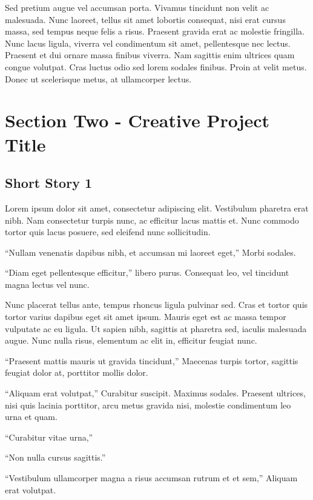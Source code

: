 \documentclass[a4paper]{memoir}
\begin{document}
Sed pretium augue vel accumsan porta. Vivamus tincidunt non velit ac malesuada. Nunc laoreet, tellus sit amet lobortis consequat, nisi erat cursus massa, sed tempus neque felis a risus. Praesent gravida erat ac molestie fringilla. Nunc lacus ligula, viverra vel condimentum sit amet, pellentesque nec lectus. Praesent et dui ornare massa finibus viverra. Nam sagittis enim ultrices quam congue volutpat. Cras luctus odio sed lorem sodales finibus. Proin at velit metus. Donec ut scelerisque metus, at ullamcorper lectus. 

\part{Section Two - Creative Project Title}
\label{sectiontwo-creativeprojecttitle}

\chapter{Short Story 1}
\label{shortstory1}

Lorem ipsum dolor sit amet, consectetur adipiscing elit. Vestibulum pharetra erat nibh. Nam consectetur turpis nunc, ac efficitur lacus mattis et. Nunc commodo tortor quis lacus posuere, sed eleifend nunc sollicitudin. 

“Nullam venenatis dapibus nibh, et accumsan mi laoreet eget,” Morbi sodales.

“Diam eget pellentesque efficitur,” libero purus. Consequat leo, vel tincidunt magna lectus vel nunc. 

Nunc placerat tellus ante, tempus rhoncus ligula pulvinar sed. Cras et tortor quis tortor varius dapibus eget sit amet ipsum. Mauris eget est ac massa tempor vulputate ac eu ligula. Ut sapien nibh, sagittis at pharetra sed, iaculis malesuada augue. Nunc nulla risus, elementum ac elit in, efficitur feugiat nunc. 

“Praesent mattis mauris ut gravida tincidunt,” Maecenas turpis tortor, sagittis feugiat dolor at, porttitor mollis dolor. 

“Aliquam erat volutpat,” Curabitur suscipit. Maximus sodales. Praesent ultrices, nisi quis lacinia porttitor, arcu metus gravida nisi, molestie condimentum leo urna et quam. 

“Curabitur vitae urna,”

“Non nulla cursus sagittis.”

“Vestibulum ullamcorper magna a risus accumsan rutrum et et sem,” Aliquam erat volutpat. 
\end{document}
